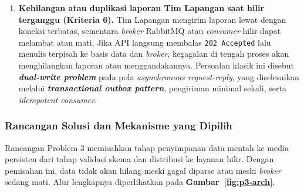 \begin{enumerate}
  \item \textbf{Kehilangan atau duplikasi laporan Tim Lapangan saat hilir terganggu (Kriteria 6).}
  Tim Lapangan mengirim laporan lewat  dengan koneksi terbatas, sementara \textit{broker} RabbitMQ atau \textit{consumer} hilir dapat melambat atau mati. Jika API langsung membalas \texttt{202 Accepted} lalu menulis terpisah ke basis data dan \textit{broker}, kegagalan di tengah proses akan menghilangkan laporan atau menggandakannya. Persoalan klasik ini disebut \textbf{\textit{dual-write problem}} pada pola \textit{asynchronous request-reply}, yang diselesaikan melalui \textbf{\textit{transactional outbox pattern}}, pengiriman minimal sekali, serta \textit{idempotent consumer}.
\end{enumerate}

\subsubsection{Rancangan Solusi dan Mekanisme yang Dipilih}

Rancangan Problem 3 memisahkan tahap penyimpanan data mentah ke media persisten dari tahap validasi skema dan distribusi ke layanan hilir. Dengan pemisahan ini, data tidak akan hilang meski gagal diparse atau meski \textit{broker} sedang mati. Alur lengkapnya diperlihatkan pada \textbf{Gambar~\ref{fig:p3-arch}}.

